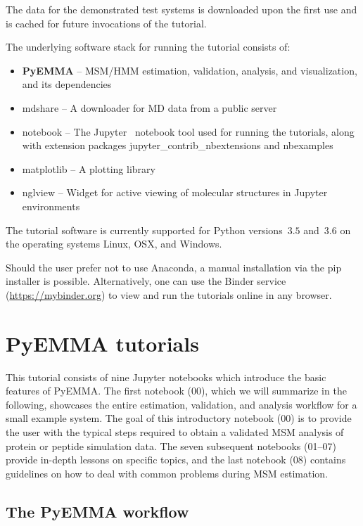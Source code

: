 \documentclass[9pt,tutorial]{livecoms}
\begin{document}
The data for the demonstrated test systems is downloaded upon the first use and is cached for future invocations of the tutorial.

The underlying software stack for running the tutorial consists of:
\begin{itemize}
\item \textbf{PyEMMA} -- MSM/HMM estimation, validation, analysis, and visualization, and its dependencies~\cite{pyemma}
\item mdshare -- A downloader for MD data from a public server
\item notebook -- The Jupyter~\cite{jupyter} notebook tool used for running the tutorials, along with extension packages jupyter\_contrib\_nbextensions and nbexamples
\item matplotlib -- A plotting library~\cite{matplotlib}
\item nglview -- Widget for active viewing of molecular structures in Jupyter environments~\cite{nglview}
\end{itemize}

The tutorial software is currently supported for Python versions~$3.5$ and~$3.6$ on the operating systems Linux, OSX, and Windows.

Should the user prefer not to use Anaconda, a manual installation via the pip installer is possible.
Alternatively, one can use the Binder service (\url{https://mybinder.org}) to view and run the tutorials online in any browser.

\section{PyEMMA tutorials}

This tutorial consists of nine Jupyter notebooks which introduce the basic features of PyEMMA.
The first notebook (00), which we will summarize in the following, showcases the entire estimation,
validation, and analysis workflow for a small example system.
The goal of this introductory notebook (00) is to provide the user with the typical steps required to obtain a validated MSM analysis of protein or peptide simulation data.
The seven subsequent notebooks (01--07) provide in-depth lessons on specific topics,
and the last notebook (08) contains guidelines on how to deal with common problems during MSM estimation.

\subsection{The PyEMMA workflow}
\end{document}
